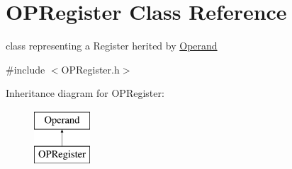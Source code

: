 \hypertarget{class_o_p_register}{}\section{O\+P\+Register Class Reference}
\label{class_o_p_register}


class representing a Register herited by \mbox{\hyperlink{class_operand}{Operand}}  




{\ttfamily \#include $<$O\+P\+Register.\+h$>$}

Inheritance diagram for O\+P\+Register\+:\begin{figure}[H]
\begin{center}
\leavevmode
\includegraphics[height=2.000000cm]{class_o_p_register}
\end{center}
\end{figure}
